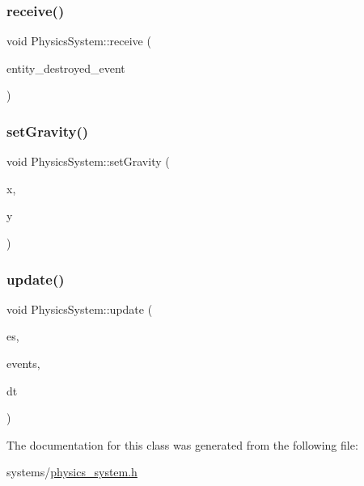 \mbox{\label{classPhysicsSystem_ac7e8c1e5a616b42189de4605e4b6a687}} 
\subsubsection{\texorpdfstring{receive()}{receive()}\hspace{0.1cm}{\footnotesize\ttfamily [2/2]}}
{\footnotesize\ttfamily void Physics\+System\+::receive (\begin{DoxyParamCaption}\item[{const ex\+::\+Entity\+Destroyed\+Event \&}]{entity\+\_\+destroyed\+\_\+event }\end{DoxyParamCaption})\hspace{0.3cm}{\ttfamily [inline]}}

\mbox{\label{classPhysicsSystem_a01fa32b7faab08192ae96e4520b8765a}} 
\subsubsection{\texorpdfstring{set\+Gravity()}{setGravity()}}
{\footnotesize\ttfamily void Physics\+System\+::set\+Gravity (\begin{DoxyParamCaption}\item[{float}]{x,  }\item[{float}]{y }\end{DoxyParamCaption})\hspace{0.3cm}{\ttfamily [inline]}}

\mbox{\label{classPhysicsSystem_a4e3674b18191bada7b4b79c5a4dcf5e2}} 
\subsubsection{\texorpdfstring{update()}{update()}}
{\footnotesize\ttfamily void Physics\+System\+::update (\begin{DoxyParamCaption}\item[{ex\+::\+Entity\+Manager \&}]{es,  }\item[{ex\+::\+Event\+Manager \&}]{events,  }\item[{ex\+::\+Time\+Delta}]{dt }\end{DoxyParamCaption})\hspace{0.3cm}{\ttfamily [inline]}}



The documentation for this class was generated from the following file\+:\begin{DoxyCompactItemize}
\item 
systems/\hyperlink{physics__system_8h}{physics\+\_\+system.\+h}\end{DoxyCompactItemize}
